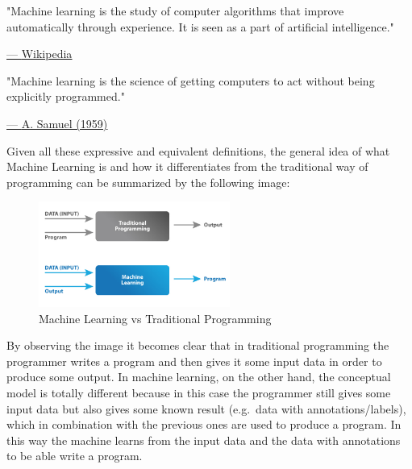 \vspace{5mm}

\begin{quoting}
    "Machine learning is the study of computer algorithms that improve
    automatically through experience. It is seen as a part of artificial
    intelligence."
\end{quoting}

\hspace{350pt}
\href{https://en.wikipedia.org/wiki/Machine_learning}{--- \underline{Wikipedia}}

\vspace{5mm}

\begin{quoting}
    "Machine learning is the science of getting computers to act without
    being explicitly programmed."
\end{quoting}

\hspace{317pt}
\href{https://en.wikipedia.org/wiki/Arthur_Samuel}{--- \underline{A. Samuel (1959)}}

\vspace{10mm}

Given all these expressive and equivalent definitions, the general idea
of what Machine Learning is and how it differentiates from the
traditional way of programming can be summarized by the following image:

\vspace{10mm}

\begin{figure}[h]
    \centering
    \includegraphics[width=0.56\textwidth]{../img/ML_vs_TP}
    \caption{Machine Learning vs Traditional Programming}
\end{figure}

\vspace{5mm}

By observing the image it becomes clear that in traditional programming
the programmer writes a program and then gives it some input data in
order to produce some output. In machine learning, on the other hand,
the conceptual model is totally different because in this case the
programmer still gives some input data but also gives some known result
(e.g.\ data with annotations/labels), which in combination with the
previous ones are used to produce a program. In this way the machine
learns from the input data and the data with annotations to be able
write a program.

